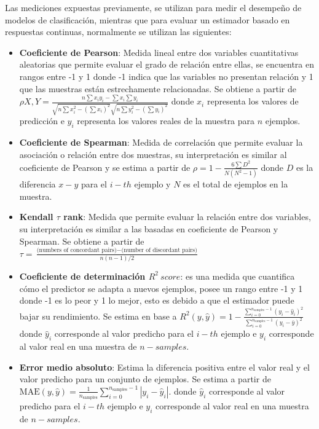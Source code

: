 Las mediciones expuestas previamente, se utilizan para medir el desempeño de modelos de clasificación, mientras que para evaluar un estimador basado en respuestas continuas, normalmente se utilizan las siguientes:

\begin{itemize}
	
	\item \textbf{Coeficiente de Pearson}: Medida lineal entre dos variables cuantitativas aleatorias que permite evaluar el grado de relación entre ellas, se encuentra en rangos entre -1 y 1 donde -1 indica que las variables no presentan relación y 1 que las muestras están estrechamente relacionadas. Se obtiene a partir de $\rho X,Y= \frac{n\sum x_{i}y_{i} - \sum x_{i} \sum y_{i}}{\sqrt{n\sum x^{2}_{i}- (\sum x_{i})^{2}} \sqrt{n\sum y^{2}_{i}- (\sum y_{i})^{2}}}$ donde $x_{i}$ representa los valores de predicción e $y_{i}$ representa los valores reales de la muestra para $n$ ejemplos.
	
	\item \textbf{Coeficiente de Spearman}: Medida de correlación que permite evaluar la asociación o relación entre dos muestras, su interpretación es similar al coeficiente de Pearson y se estima a partir de $\rho = 1- \frac{6\sum D^{2}}{N(N^{2}-1)}$ donde $D$ es la diferencia $x-y$ para el $i-th$ ejemplo y $N$ es el total de ejemplos en la muestra.
	
	\item \textbf{Kendall $\tau$ rank}: Medida que permite evaluar la relación entre dos variables, su interpretación es similar a las basadas en coeficiente de Pearson y Spearman. Se obtiene a partir de $\tau = \frac{\text{(numbers of concordant pairs)} - \text{(number of discordant pairs)}}{n(n-1)/2}$
	
	\item \textbf{Coeficiente de determinación $R^{2}\ score$}: es una medida que cuantifica cómo el predictor se adapta a nuevos ejemplos, posee un rango entre -1 y 1 donde -1 es lo peor y 1 lo mejor, esto es debido a que el estimador puede bajar su rendimiento. Se estima en base a $R^2(y, \hat{y}) = 1 - \frac{\sum_{i=0}^{n_{\text{samples}} - 1} (y_i - \hat{y}_i)^2}{\sum_{i=0}^{n_\text{samples} - 1} (y_i - \bar{y})^2}$ donde $\hat{y}_i$ corresponde al valor predicho para el $i-th$ ejemplo e $y_{i}$ corresponde al valor real en una muestra de $n-samples$.
	
	\item \textbf{Error medio absoluto}: Estima la diferencia positiva entre el valor real y el valor predicho para un conjunto de ejemplos. Se estima a partir de $\text{MAE}(y, \hat{y}) = \frac{1}{n_{\text{samples}}} \sum_{i=0}^{n_{\text{samples}}-1} \left| y_i - \hat{y}_i \right|.$ donde $\hat{y}_i$ corresponde al valor predicho para el $i-th$ ejemplo e $y_{i}$ corresponde al valor real en una muestra de $n-samples$.
	

\end{itemize}
